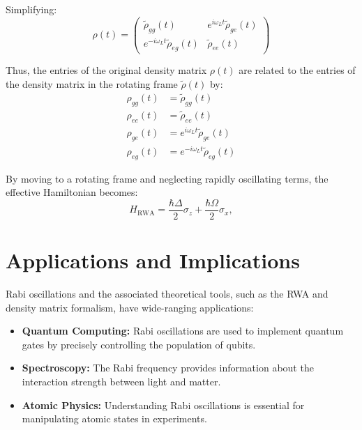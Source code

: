 Simplifying:
\begin{equation}
	\rho(t) =
	\begin{pmatrix}
		\tilde{\rho}_{gg}(t)                  & e^{i\omega_L t} \tilde{\rho}_{ge}(t) \\
		e^{-i\omega_L t} \tilde{\rho}_{eg}(t) & \tilde{\rho}_{ee}(t)
	\end{pmatrix}
	\label{eq:FinalRecoveredDensityMatrix}
\end{equation}

Thus, the entries of the original density matrix $\rho(t)$ are related to the entries of the density matrix in the rotating frame $\tilde{\rho}(t)$ by:
\begin{align*}
	\rho_{gg}(t) & = \tilde{\rho}_{gg}(t)                  \\
	\rho_{ee}(t) & = \tilde{\rho}_{ee}(t)                  \\
	\rho_{ge}(t) & = e^{i\omega_L t} \tilde{\rho}_{ge}(t)  \\
	\rho_{eg}(t) & = e^{-i\omega_L t} \tilde{\rho}_{eg}(t)
\end{align*}



By moving to a rotating frame and neglecting rapidly oscillating terms, the effective Hamiltonian becomes:
\begin{equation}
	H_{\text{RWA}} = \frac{\hbar \Delta}{2} \sigma_z + \frac{\hbar \Omega}{2} \sigma_x,
	\label{eq:RWAHamiltonian}
\end{equation}






\section{Applications and Implications}

Rabi oscillations and the associated theoretical tools, such as the RWA and density matrix formalism, have wide-ranging applications:
\begin{itemize}
	\item \textbf{Quantum Computing:} Rabi oscillations are used to implement quantum gates by precisely controlling the population of qubits.
	\item \textbf{Spectroscopy:} The Rabi frequency provides information about the interaction strength between light and matter.
	\item \textbf{Atomic Physics:} Understanding Rabi oscillations is essential for manipulating atomic states in experiments.
\end{itemize}

